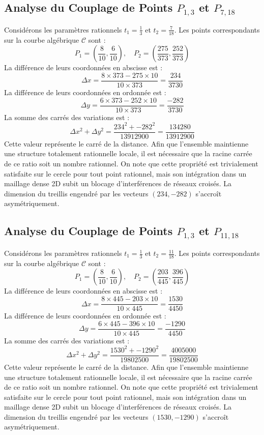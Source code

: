 \documentclass[12pt, a4paper]{article}
\begin{document}
\subsection{Analyse du Couplage de Points $P_{1,3}$ et $P_{7,18}$}
Considérons les paramètres rationnels $t_1 = \frac{1}{3}$ et $t_2 = \frac{7}{18}$.
Les points correspondants sur la courbe algébrique $\mathcal{C}$ sont :
$$ P_1 = \left( \frac{8}{10}, \frac{6}{10} \right), \quad P_2 = \left( \frac{275}{373}, \frac{252}{373} \right) $$
La différence de leurs coordonnées en abscisse est :
$$ \Delta x = \frac{8 \times 373 - 275 \times 10}{10 \times 373} = \frac{234}{3730} $$
La différence de leurs coordonnées en ordonnée est :
$$ \Delta y = \frac{6 \times 373 - 252 \times 10}{10 \times 373} = \frac{-282}{3730} $$
La somme des carrés des variations est :
$$ \Delta x^2 + \Delta y^2 = \frac{ 234^2 + -282^2 }{ 13912900 } = \frac{ 134280 }{ 13912900 } $$
Cette valeur représente le carré de la distance. Afin que l'ensemble maintienne une structure totalement rationnelle locale, il est nécessaire que la racine carrée de ce ratio soit un nombre rationnel. On note que cette propriété est trivialement satisfaite sur le cercle pour tout point rationnel, mais son intégration dans un maillage dense 2D subit un blocage d'interférences de réseaux croisés. La dimension du treillis engendré par les vecteurs $( 234, -282 )$ s'accroît asymétriquement.


\subsection{Analyse du Couplage de Points $P_{1,3}$ et $P_{11,18}$}
Considérons les paramètres rationnels $t_1 = \frac{1}{3}$ et $t_2 = \frac{11}{18}$.
Les points correspondants sur la courbe algébrique $\mathcal{C}$ sont :
$$ P_1 = \left( \frac{8}{10}, \frac{6}{10} \right), \quad P_2 = \left( \frac{203}{445}, \frac{396}{445} \right) $$
La différence de leurs coordonnées en abscisse est :
$$ \Delta x = \frac{8 \times 445 - 203 \times 10}{10 \times 445} = \frac{1530}{4450} $$
La différence de leurs coordonnées en ordonnée est :
$$ \Delta y = \frac{6 \times 445 - 396 \times 10}{10 \times 445} = \frac{-1290}{4450} $$
La somme des carrés des variations est :
$$ \Delta x^2 + \Delta y^2 = \frac{ 1530^2 + -1290^2 }{ 19802500 } = \frac{ 4005000 }{ 19802500 } $$
Cette valeur représente le carré de la distance. Afin que l'ensemble maintienne une structure totalement rationnelle locale, il est nécessaire que la racine carrée de ce ratio soit un nombre rationnel. On note que cette propriété est trivialement satisfaite sur le cercle pour tout point rationnel, mais son intégration dans un maillage dense 2D subit un blocage d'interférences de réseaux croisés. La dimension du treillis engendré par les vecteurs $( 1530, -1290 )$ s'accroît asymétriquement.
\end{document}
